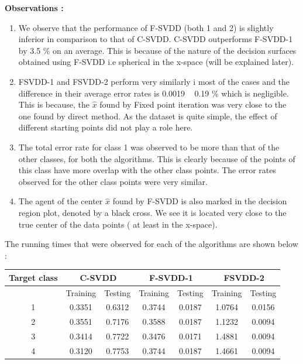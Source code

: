 \documentclass{article} %
\begin{document}
\textbf{Observations :}
\begin{enumerate}
\item We observe that the performance of F-SVDD  (both 1 and 2) is slightly inferior in comparison to that of C-SVDD. C-SVDD outperforms F-SVDD-1 by 3.5 \% on an average. This is because of the nature of the decision surfaces obtained using F-SVDD i.e  spherical in the x-space (will be explained later).

\item FSVDD-1 and FSVDD-2 perform very similarly i most of the cases and the difference in their average error rates is 0.0019 ~ 0.19 \% which is negligible. This is because, the $\hat{x}$ found by Fixed point iteration was very close to the one found by direct method. As the dataset is quite simple, the effect of different starting points did not play a role here.

\item The total error rate for class 1 was observed to be more than that of the other classes, for both the algorithms. This is clearly because of the points of this class have more overlap with the other class points. The error rates observed for the other class points were very similar.
\item The agent of the center $\hat{x}$ found by F-SVDD is also marked in the decision region plot, denoted by a black cross. We see it is located very close to the true center of the data points ( at least in the x-space).

\end{enumerate}


The running times that were observed for each of the algorithms are shown below :

\begin{center}
\begin{tabular}{|c|c|c|c|c|c|c|}
\hline
Target class & \multicolumn{2}{|c|}{C-SVDD} & \multicolumn{2}{|c|}{F-SVDD-1} & \multicolumn{2}{|c|}{FSVDD-2}  \\ \hline
& Training & Testing & Training & Testing & Training & Testing \\ \hline
1 & 0.3351 & 0.6312 & 0.3744  & 0.0187 & 1.0764 & 0.0156 \\ \hline
2 & 0.3551 & 0.7176 & 0.3588 & 0.0187 & 1.1232 & 0.0094 \\ \hline
3 & 0.3414 & 0.7722 & 0.3476 & 0.0171 & 1.4881 & 0.0094 \\ \hline
4 & 0.3120 & 0.7753 & 0.3744 & 0.0187 & 1.4661 &  0.0094 \\ \hline

\end{tabular} \\[5pt]
\end{center}
\end{document}
